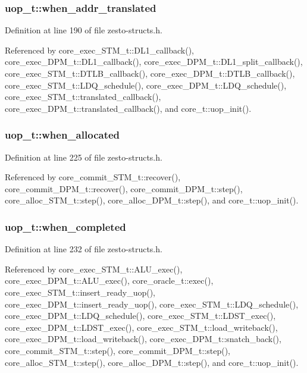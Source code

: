 \subsubsection[{when\_\-addr\_\-translated}]{ {\bf uop\_\-t::when\_\-addr\_\-translated}}\label{structuop__t_44c8299aefb215702694ddcc3922b1d6}




Definition at line 190 of file zesto-structs.h.

Referenced by core\_\-exec\_\-STM\_\-t::DL1\_\-callback(), core\_\-exec\_\-DPM\_\-t::DL1\_\-callback(), core\_\-exec\_\-DPM\_\-t::DL1\_\-split\_\-callback(), core\_\-exec\_\-STM\_\-t::DTLB\_\-callback(), core\_\-exec\_\-DPM\_\-t::DTLB\_\-callback(), core\_\-exec\_\-STM\_\-t::LDQ\_\-schedule(), core\_\-exec\_\-DPM\_\-t::LDQ\_\-schedule(), core\_\-exec\_\-STM\_\-t::translated\_\-callback(), core\_\-exec\_\-DPM\_\-t::translated\_\-callback(), and core\_\-t::uop\_\-init().
\subsubsection[{when\_\-allocated}]{ {\bf uop\_\-t::when\_\-allocated}}\label{structuop__t_826f35ba23d6193e5bfb44bddb3dabc9}




Definition at line 225 of file zesto-structs.h.

Referenced by core\_\-commit\_\-STM\_\-t::recover(), core\_\-commit\_\-DPM\_\-t::recover(), core\_\-commit\_\-DPM\_\-t::step(), core\_\-alloc\_\-STM\_\-t::step(), core\_\-alloc\_\-DPM\_\-t::step(), and core\_\-t::uop\_\-init().
\subsubsection[{when\_\-completed}]{ {\bf uop\_\-t::when\_\-completed}}\label{structuop__t_bad67330b68f9df896e3846b50df1f14}




Definition at line 232 of file zesto-structs.h.

Referenced by core\_\-exec\_\-STM\_\-t::ALU\_\-exec(), core\_\-exec\_\-DPM\_\-t::ALU\_\-exec(), core\_\-oracle\_\-t::exec(), core\_\-exec\_\-STM\_\-t::insert\_\-ready\_\-uop(), core\_\-exec\_\-DPM\_\-t::insert\_\-ready\_\-uop(), core\_\-exec\_\-STM\_\-t::LDQ\_\-schedule(), core\_\-exec\_\-DPM\_\-t::LDQ\_\-schedule(), core\_\-exec\_\-STM\_\-t::LDST\_\-exec(), core\_\-exec\_\-DPM\_\-t::LDST\_\-exec(), core\_\-exec\_\-STM\_\-t::load\_\-writeback(), core\_\-exec\_\-DPM\_\-t::load\_\-writeback(), core\_\-exec\_\-DPM\_\-t::snatch\_\-back(), core\_\-commit\_\-STM\_\-t::step(), core\_\-commit\_\-DPM\_\-t::step(), core\_\-alloc\_\-STM\_\-t::step(), core\_\-alloc\_\-DPM\_\-t::step(), and core\_\-t::uop\_\-init().

